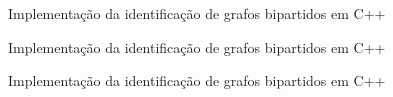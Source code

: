 \begin{frame}[fragile]{Implementação da identificação de grafos bipartidos em C++}
\end{frame}

\begin{frame}[fragile]{Implementação da identificação de grafos bipartidos em C++}
\end{frame}

\begin{frame}[fragile]{Implementação da identificação de grafos bipartidos em C++}
\end{frame}
